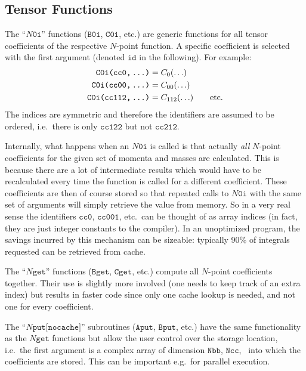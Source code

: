 \documentclass[twoside,12pt]{report}
\let\dots\textellipsis
\def\ie{i.e.\ }
\def\eg{e.g.\ }
\def\Code#1{\ensuremath{\texttt{#1}}}
\begin{document}
\subsection{Tensor Functions}
%
%

The ``\Code{$N$0i}'' functions (\Code{B0i}, \Code{C0i}, etc.) are generic
functions for all tensor coefficients of the respective $N$-point 
function.  A specific coefficient is selected with the first argument
(denoted \Code{id} in the following).  For example:
$$
\begin{aligned}
\text{\Code{C0i(cc0,\,\dots)}} &= C_0(\ldots) \\
\text{\Code{C0i(cc00,\,\dots)}} &= C_{00}(\ldots) \\
\text{\Code{C0i(cc112,\,\dots)}} &= C_{112}(\ldots) \qquad \text{etc.}
\end{aligned}
$$
The indices are symmetric and therefore the identifiers are assumed to be
ordered, \ie there is only \Code{cc122} but not \Code{cc212}.

%
Internally, what happens when an \Code{$N$0i} is called is that actually
\textit{all} $N$-point coefficients for the given set of momenta and
masses are calculated.  This is because there are a lot of intermediate
results which would have to be recalculated every time the function is 
called for a different coefficient.  These coefficients are then of course 
stored so that repeated calls to \Code{$N$0i} with the same set of 
arguments will simply retrieve the value from memory.  So in a very real 
sense the identifiers \Code{cc0}, \Code{cc001}, etc.\ can be thought of 
as array indices (in fact, they are just integer constants to the compiler).  
In an unoptimized program, the savings incurred by this mechanism can be 
sizeable: typically 90\% of integrals requested can be retrieved from cache.

The ``\Code{$N$get}'' functions (\Code{Bget}, \Code{Cget}, etc.) compute 
all $N$-point coefficients together.  Their use is slightly more 
involved (one needs to keep track of an extra index) but results in 
faster code since only one cache lookup is needed, and not one for every 
coefficient.

The ``\Code{$N$put$[$nocache$]$}'' subroutines (\Code{Aput}, 
\Code{Bput}, etc.) have the same functionality as the \Code{$N$get} 
functions but allow the user control over the storage location, \ie the 
first argument is a complex array of dimension \Code{Nbb}, \Code{Ncc}, 
\dots\ into which the coefficients are stored.  This can be important 
\eg for parallel execution.
\end{document}
